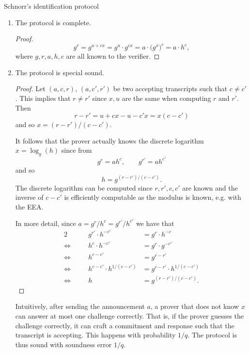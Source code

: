 \documentclass{practice}
\begin{document}
\begin{task}{Schnorr's identification protocol}
  \begin{enumerate}
    \item The protocol is complete.
    
    \begin{proof}
      \[
        g^r = g^{u + cx} = g^u \cdot g^{cx} = a\cdot \bigl(g^{x}\bigr)^c = a\cdot h^c,
      \]
      where $g, r, a, h, c$ are all known to the verifier.
    \end{proof}

    \item The protocol is special sound.
    
    \begin{proof}
      Let $(a, c, r)$, $(a, c', r')$ be two accepting transcripts such that $c \neq c'$.
      This implies that $r \neq r'$ since $x, u$ are the same when computing $r$ and $r'$.
      Then
      \[
        r - r' = u + cx - u - c'x = x(c - c')
      \]
      and so $x = (r - r')/(c - c')$.

      It follows that the prover actually knows the discrete logarithm $x = \log_g(h)$ since from
      \[
        g^r = ah^c,\qquad g^{r'} = ah^{c'}
      \]
      and so
      \[
        h = g^{(r-r')/(c - c')}.
      \]
      The discrete logarithm can be computed since $r, r', c, c'$ are known and the inverse of $c - c'$ is efficiently computable as the modulus is known, e.g. with the EEA.

      In more detail, since $a = g^r/h^c = g^{r'}/h^{c'}$ we have that
      \begin{alignat*}{2}
        && g^{r'} \cdot h^{-c'} &= g^r \cdot h^{-c} \\
        \Leftrightarrow\quad&& h^c \cdot h^{-c'} &= g^r \cdot g^{-r'}\\
        \Leftrightarrow\quad&& h^{c - c'} &= g^{r - r'} \\
        \Leftrightarrow\quad&& h^{c - c'} \cdot h^{1/(c - c')} &= g^{r - r'} \cdot h^{1/(c - c')} \\
        \Leftrightarrow\quad&& h &= g^{(r-r')/(c - c')}.
      \end{alignat*}
    \end{proof}

    Intuitively, after sending the announcement $a$, a prover that does not know $x$ can answer at most one challenge correctly.
    That is, if the prover guesses the challenge correctly, it can craft a commitment and response such that the transcript is accepting\footnotemark{}.
    This happens with probability $1/q$.
    The protocol is thus sound with soundness error $1/q$.


\end{enumerate}
\end{task}
\end{document}
